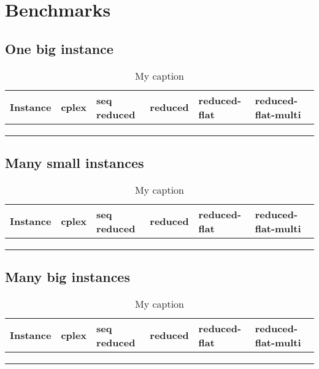 \section{Benchmarks}
\subsection{One big instance}
\begin{table}[H]
	\centering
	\caption{My caption}
	\label{my-label}
	\begin{tabular}{|l|l|l|l|l|l|}\hline
		Instance & cplex & seq reduced & reduced & reduced-flat & reduced-flat-multi \\\hline
		&       &             &         &              &                    \\\hline
		&       &             &         &              &                    \\\hline
		&       &             &         &              &                   \\\hline
	\end{tabular}
\end{table}

\subsection{Many small instances}
\begin{table}[H]
	\centering
	\caption{My caption}
	\label{my-label}
	\begin{tabular}{|l|l|l|l|l|l|}\hline
		Instance & cplex & seq reduced & reduced & reduced-flat & reduced-flat-multi \\\hline
		&       &             &         &              &                    \\\hline
		&       &             &         &              &                    \\\hline
		&       &             &         &              &                   \\\hline
	\end{tabular}
\end{table}



\subsection{Many big instances}
\begin{table}[H]
	\centering
	\caption{My caption}
	\label{my-label}
	\begin{tabular}{|l|l|l|l|l|l|}\hline
		Instance & cplex & seq reduced & reduced & reduced-flat & reduced-flat-multi \\\hline
		&       &             &         &              &                    \\\hline
		&       &             &         &              &                    \\\hline
		&       &             &         &              &                   \\\hline
	\end{tabular}
\end{table}

